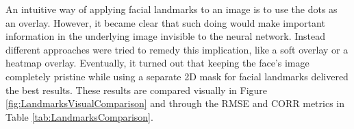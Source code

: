 An intuitive way of applying facial landmarks to an image is to use the dots as an overlay. However, it became clear that such doing would make important information in the underlying image invisible to the neural network. Instead different approaches were tried to remedy this implication, like a soft overlay or a heatmap overlay. Eventually, it turned out that keeping the face's image completely pristine while using a separate 2D mask for facial landmarks delivered the best results. These results are compared visually in Figure \ref{fig:LandmarksVisualComparison} and through the RMSE and CORR metrics in Table \ref{tab:LandmarksComparison}.

\begin{figure}[H]
  \begin{center}
  \hfill
  \hfill

\end{center}
\end{figure}
